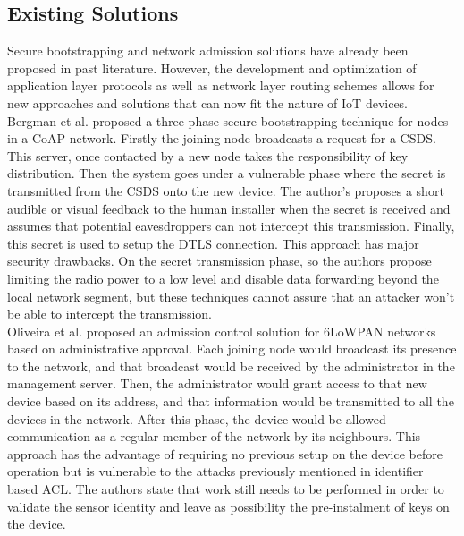 \documentclass{sig-alternate-05-2015}
\begin{document}
\subsection{Existing Solutions}
Secure bootstrapping and network admission solutions have already been proposed in past literature. However, the development and optimization of application layer protocols as well as network layer routing schemes allows for new approaches and solutions that can now fit the nature of \gls{IoT} devices.
Bergman et al. \cite{Bergmann2012} proposed a three-phase secure bootstrapping technique for nodes in a \gls{CoAP} network. Firstly the joining node broadcasts a request for a \gls{CSDS}. This server, once contacted by a new node takes the responsibility of key distribution. Then the system goes under a vulnerable phase where the secret is transmitted from the \gls{CSDS} onto the new device. The author's proposes a short audible or visual feedback to the human installer when the secret is received and assumes that potential eavesdroppers can not intercept this transmission. Finally, this secret is used to setup the \gls{DTLS} connection. This approach has major security drawbacks. On the secret transmission phase, so the authors propose limiting the radio power to a low level and disable data forwarding beyond the local network segment, but these techniques cannot assure that an attacker won't be able to intercept the transmission.\\
Oliveira et al. \cite{Oliveira2013} proposed an admission control solution for 6LoWPAN networks based on administrative approval. Each joining node would broadcast its presence to the network, and that broadcast would be received by the administrator in the management server. Then, the administrator would grant access to that new device based on its address, and that information would be transmitted to all the devices in the network. After this phase, the device would be allowed communication as a regular member of the network by its neighbours. This approach has the advantage of requiring no previous setup on the device before operation but is vulnerable to the attacks previously mentioned in identifier based \gls{ACL}. The authors state that work still needs to be performed in order to validate the sensor identity and leave as possibility the pre-instalment of keys on the device. 
\end{document}
